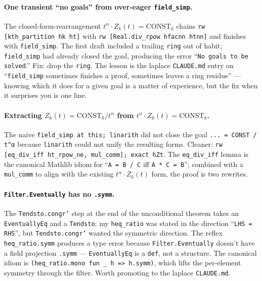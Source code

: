 \documentclass[11pt]{article}
\begin{document}
\paragraph{One transient ``no goals'' from over-eager
\texttt{field\_simp}.} The closed-form-rearrangement
$t^\alpha \cdot Z_k(t) = \mathrm{CONST}_k$ chains
\texttt{rw [kth\_partition hk ht]} with
\texttt{rw [Real.div\_rpow hfacnn htnn]} and finishes with
\texttt{field\_simp}. The first draft included a trailing \texttt{ring}
out of habit; \texttt{field\_simp} had already closed the goal,
producing the error ``\texttt{No goals to be solved}.''  Fix: drop the
\texttt{ring}. The lesson is the laplace \texttt{CLAUDE.md} entry on
``\texttt{field\_simp} sometimes finishes a proof, sometimes leaves a
ring residue'' — knowing which it does for a given goal is a matter
of experience, but the fix when it surprises you is one line.

\paragraph{Extracting $Z_k(t) = \mathrm{CONST}_k / t^\alpha$ from
$t^\alpha \cdot Z_k(t) = \mathrm{CONST}_k$.} The naive
\texttt{field\_simp at this; linarith} did not close the goal
\texttt{... = CONST / t\^{}α} because \texttt{linarith} could not unify
the resulting forms. Cleaner: \texttt{rw [eq\_div\_iff
ht\_rpow\_ne, mul\_comm]; exact hZt}. The \texttt{eq\_div\_iff} lemma
is the canonical Mathlib idiom for ``\texttt{A = B / C} iff
\texttt{A * C = B}''; combined with a \texttt{mul\_comm} to align with
the existing $t^\alpha \cdot Z_k(t)$ form, the proof is two rewrites.

\paragraph{\texttt{Filter.Eventually} has no \texttt{.symm}.} The
\texttt{Tendsto.congr'} step at the end of the unconditional theorem
takes an \texttt{EventuallyEq} and a \texttt{Tendsto}; my
\texttt{heq\_ratio} was stated in the direction
``\texttt{LHS = RHS}'', but \texttt{Tendsto.congr'} wanted the symmetric
direction. The reflex \texttt{heq\_ratio.symm} produces a type error
because \texttt{Filter.Eventually} doesn't have a field projection
\texttt{.symm} — \texttt{EventuallyEq} is a \texttt{def}, not a
structure. The canonical idiom is
\texttt{(heq\_ratio.mono fun \_ h => h.symm)}, which lifts the per-element
symmetry through the filter. Worth promoting to the laplace
\texttt{CLAUDE.md}.
\end{document}
